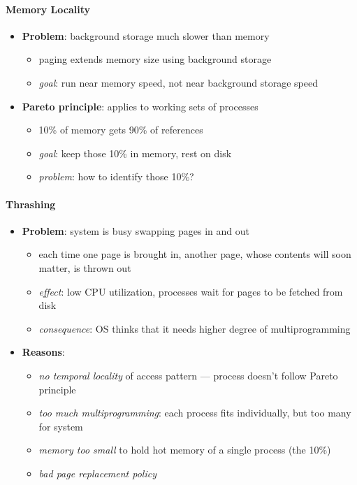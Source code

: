 \paragraph{Memory Locality}
\begin{itemize}
  \item \textbf{Problem}: background storage much slower than memory
  \begin{itemize}
    \item paging extends memory size using background storage
    \item \emph{goal}: run near memory speed, not near background storage speed
  \end{itemize}
  \item \textbf{Pareto principle}: applies to working sets of processes
  \begin{itemize}
    \item 10\% of memory gets 90\% of references
    \item \emph{goal}: keep those 10\% in memory, rest on disk
    \item \emph{problem}: how to identify those 10\%?
  \end{itemize}
\end{itemize}

\paragraph{Thrashing}
\begin{itemize}
  \item \textbf{Problem}: system is busy swapping pages in and out
  \begin{itemize}
    \item each time one page is brought in, another page, whose contents will soon matter, is thrown out
    \item \emph{effect}: low CPU utilization, processes wait for pages to be fetched from disk
    \item \emph{consequence}: OS thinks that it needs higher degree of multiprogramming
  \end{itemize}
  \item \textbf{Reasons}:
  \begin{itemize}
    \item \emph{no temporal locality} of access pattern --- process doesn't follow Pareto principle
    \item \emph{too much multiprogramming}: each process fits individually, but too many for system
    \item \emph{memory too small} to hold hot memory of a single process (the 10\%)
    \item \emph{bad page replacement policy}
  \end{itemize}
\end{itemize}

